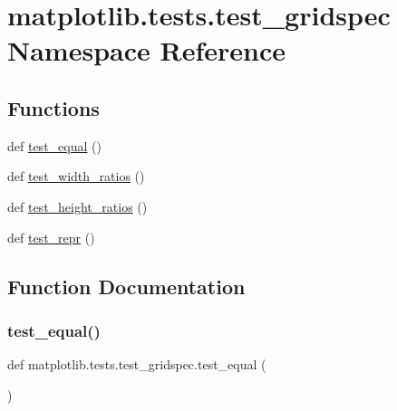 \hypertarget{namespacematplotlib_1_1tests_1_1test__gridspec}{}\section{matplotlib.\+tests.\+test\+\_\+gridspec Namespace Reference}
\label{namespacematplotlib_1_1tests_1_1test__gridspec}
\subsection*{Functions}
\begin{DoxyCompactItemize}
\item 
def \hyperlink{namespacematplotlib_1_1tests_1_1test__gridspec_aef12cea55d72528d25c58151664c1095}{test\+\_\+equal} ()
\item 
def \hyperlink{namespacematplotlib_1_1tests_1_1test__gridspec_a0cf1d836085ea72ed61c3e32775ffe0f}{test\+\_\+width\+\_\+ratios} ()
\item 
def \hyperlink{namespacematplotlib_1_1tests_1_1test__gridspec_a1c84c0b832e37924b1fe4a749fee3485}{test\+\_\+height\+\_\+ratios} ()
\item 
def \hyperlink{namespacematplotlib_1_1tests_1_1test__gridspec_af110d956502a050372b8bb3d4a68cf14}{test\+\_\+repr} ()
\end{DoxyCompactItemize}


\subsection{Function Documentation}
\mbox{\label{namespacematplotlib_1_1tests_1_1test__gridspec_aef12cea55d72528d25c58151664c1095}} 
\subsubsection{\texorpdfstring{test\+\_\+equal()}{test\_equal()}}
{\footnotesize\ttfamily def matplotlib.\+tests.\+test\+\_\+gridspec.\+test\+\_\+equal (\begin{DoxyParamCaption}{ }\end{DoxyParamCaption})}

